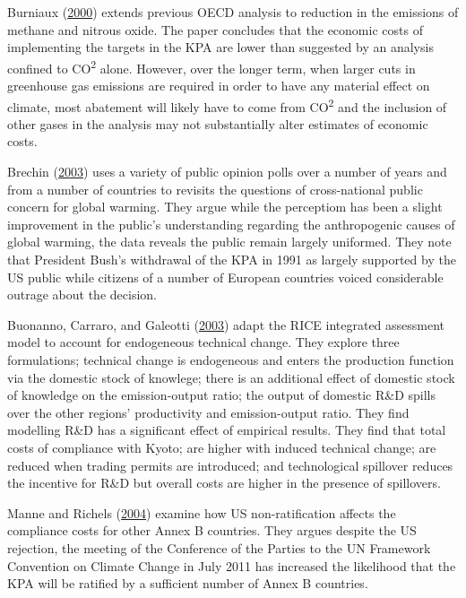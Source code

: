 \documentclass[
  12pt,
]{article}
\begin{document}
Burniaux (\protect\hyperlink{ref-Burniaux2000}{2000}) extends previous OECD analysis to reduction in the emissions of methane and nitrous oxide. The paper concludes that the economic costs of implementing the targets in the KPA are lower than suggested by an analysis confined to CO\textsuperscript{2} alone. However, over the longer term, when larger cuts in greenhouse gas emissions are required in order to have any material effect on climate, most abatement will likely have to come from CO\textsuperscript{2} and the inclusion of other gases in the analysis may not substantially alter estimates of economic costs.

Brechin (\protect\hyperlink{ref-Brechin2003}{2003}) uses a variety of public opinion polls over a number of years and from a number of countries to revisits the questions of cross-national public concern for global warming. They argue while the perceptiom has been a slight improvement in the public's understanding regarding the anthropogenic causes of global warming, the data reveals the public remain largely uniformed. They note that President Bush's withdrawal of the KPA in 1991 as largely supported by the US public while citizens of a number of European countries voiced considerable outrage about the decision.

Buonanno, Carraro, and Galeotti (\protect\hyperlink{ref-Buonanno2003}{2003}) adapt the RICE integrated assessment model to account for endogeneous technical change. They explore three formulations; technical change is endogeneous and enters the production function via the domestic stock of knowlege; there is an additional effect of domestic stock of knowledge on the emission-output ratio; the output of domestic R\&D spills over the other regions' productivity and emission-output ratio. They find modelling R\&D has a significant effect of empirical results. They find that total costs of compliance with Kyoto; are higher with induced technical change; are reduced when trading permits are introduced; and technological spillover reduces the incentive for R\&D but overall costs are higher in the presence of spillovers.

Manne and Richels (\protect\hyperlink{ref-Manne2004}{2004}) examine how US non-ratification affects the compliance costs for other Annex B countries. They argues despite the US rejection, the meeting of the Conference of the Parties to the UN Framework Convention on Climate Change in July 2011 has increased the likelihood that the KPA will be ratified by a sufficient number of Annex B countries.
\end{document}
